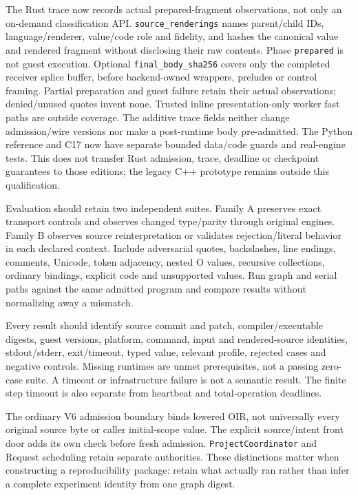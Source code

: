 \documentclass[11pt]{article}
\begin{document}
The Rust trace now records actual prepared-fragment observations, not only an on-demand classification API. \texttt{source\_renderings} names parent/child IDs, language/renderer, value/code role and fidelity, and hashes the canonical value and rendered fragment without disclosing their raw contents. Phase \texttt{prepared} is not guest execution. Optional \texttt{final\_body\_sha256} covers only the completed receiver splice buffer, before backend-owned wrappers, preludes or control framing. Partial preparation and guest failure retain their actual observations; denied/unused quotes invent none. Trusted inline presentation-only worker fast paths are outside coverage. The additive trace fields neither change admission/wire versions nor make a post-runtime body pre-admitted. The Python reference and C17 now have separate bounded data/code guards and real-engine tests. This does not transfer Rust admission, trace, deadline or checkpoint guarantees to those editions; the legacy C++ prototype remains outside this qualification.

Evaluation should retain two independent suites. Family A preserves exact transport controls and observes changed type/parity through original engines. Family B observes source reinterpretation or validates rejection/literal behavior in each declared context. Include adversarial quotes, backslashes, line endings, comments, Unicode, token adjacency, nested O values, recursive collections, ordinary bindings, explicit code and unsupported values. Run graph and serial paths against the same admitted program and compare results without normalizing away a mismatch.

Every result should identify source commit and patch, compiler/executable digests, guest versions, platform, command, input and rendered-source identities, stdout/stderr, exit/timeout, typed value, relevant profile, rejected cases and negative controls. Missing runtimes are unmet prerequisites, not a passing zero-case suite. A timeout or infrastructure failure is not a semantic result. The finite step timeout is also separate from heartbeat and total-operation deadlines.

The ordinary V6 admission boundary binds lowered OIR, not universally every original source byte or caller initial-scope value. The explicit source/intent front door adds its own check before fresh admission. \texttt{ProjectCoordinator} and Request scheduling retain separate authorities. These distinctions matter when constructing a reproducibility package: retain what actually ran rather than infer a complete experiment identity from one graph digest.
\end{document}
